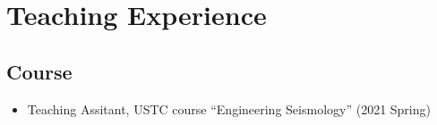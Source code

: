 \section{Teaching Experience}

\subsection{Course}
\begin{itemize}
\item Teaching Assitant, USTC course ``Engineering Seismology'' (2021 Spring)

\end{itemize}